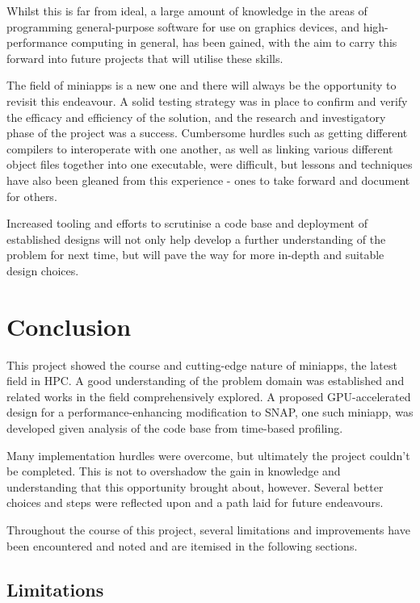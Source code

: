 \documentclass[conference]{IEEEtran}
\begin{document}
Whilst this is far from ideal, a large amount of knowledge in the areas of programming general-purpose software for use on graphics devices, and high-performance computing in general, has been gained, with the aim to carry this forward into future projects that will utilise these skills.

The field of miniapps is a new one and there will always be the opportunity to revisit this endeavour. A solid testing strategy was in place to confirm and verify the efficacy and efficiency of the solution, and the research and investigatory phase of the project was a success. Cumbersome hurdles such as getting different compilers to interoperate with one another, as well as linking various different object files together into one executable, were difficult, but lessons and techniques have also been gleaned from this experience - ones to take forward and document for others.

Increased tooling and efforts to scrutinise a code base and deployment of established designs will not only help develop a further understanding of the problem for next time, but will pave the way for more in-depth and suitable design choices.



\section{Conclusion}
\label{sec:conclusion}

This project showed the course and cutting-edge nature of miniapps, the latest field in HPC. A good understanding of the problem domain was established and related works in the field comprehensively explored. A proposed GPU-accelerated design for a performance-enhancing modification to SNAP, one such miniapp, was developed given analysis of the code base from time-based profiling.

Many implementation hurdles were overcome, but ultimately the project couldn't be completed. This is not to overshadow the gain in knowledge and understanding that this opportunity brought about, however. Several better choices and steps were reflected upon and a path laid for future endeavours.

Throughout the course of this project, several limitations and improvements have been encountered and noted and are itemised in the following sections.

\subsection{Limitations}
\label{subsec:limitations}
\end{document}
